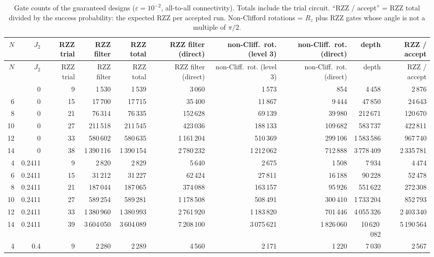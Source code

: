 \documentclass[11pt]{article}
\begin{document}
{\small
\begin{longtable}{rrrrrrrrrr}
\caption{Gate counts of the guaranteed designs ($\varepsilon=10^{-2}$, all-to-all connectivity). Totals include the trial circuit. ``RZZ / accept'' = RZZ total divided by the success probability: the expected RZZ per accepted run. Non-Clifford rotations = $R_z$ plus RZZ gates whose angle is not a multiple of $\pi/2$.}\label{tab:gc}\\
\toprule
$N$ & $J_2$ & RZZ trial & RZZ filter & RZZ total & RZZ filter (direct) & non-Cliff.\ rot. (level 3) & non-Cliff.\ rot. (direct) & depth & RZZ / accept \\
\midrule
\endfirsthead
\toprule
$N$ & $J_2$ & RZZ trial & RZZ filter & RZZ total & RZZ filter (direct) & non-Cliff.\ rot. (level 3) & non-Cliff.\ rot. (direct) & depth & RZZ / accept \\
\midrule
\endhead
\bottomrule
\endfoot
4 & 0 & 9 & 1\,530 & 1\,539 & 3\,060 & 1\,573 & 854 & 4\,458 & 2\,876 \\
6 & 0 & 15 & 17\,700 & 17\,715 & 35\,400 & 11\,867 & 9\,444 & 47\,850 & 24\,643 \\
8 & 0 & 21 & 76\,314 & 76\,335 & 152\,628 & 69\,139 & 39\,980 & 212\,671 & 120\,670 \\
10 & 0 & 27 & 211\,518 & 211\,545 & 423\,036 & 188\,133 & 109\,682 & 583\,737 & 422\,811 \\
12 & 0 & 33 & 580\,602 & 580\,635 & 1\,161\,204 & 510\,369 & 299\,106 & 1\,583\,586 & 967\,740 \\
14 & 0 & 38 & 1\,390\,116 & 1\,390\,154 & 2\,780\,232 & 1\,212\,062 & 712\,888 & 3\,778\,409 & 2\,335\,781 \\
4 & 0.2411 & 9 & 2\,820 & 2\,829 & 5\,640 & 2\,675 & 1\,508 & 7\,934 & 4\,474 \\
6 & 0.2411 & 15 & 31\,212 & 31\,227 & 62\,424 & 27\,811 & 16\,188 & 90\,228 & 52\,478 \\
8 & 0.2411 & 21 & 187\,044 & 187\,065 & 374\,088 & 163\,157 & 95\,926 & 551\,622 & 272\,308 \\
10 & 0.2411 & 27 & 589\,254 & 589\,281 & 1\,178\,508 & 508\,491 & 300\,410 & 1\,733\,204 & 852\,793 \\
12 & 0.2411 & 33 & 1\,380\,960 & 1\,380\,993 & 2\,761\,920 & 1\,183\,820 & 701\,446 & 4\,055\,326 & 2\,403\,340 \\
14 & 0.2411 & 39 & 3\,604\,050 & 3\,604\,089 & 7\,208\,100 & 3\,075\,621 & 1\,826\,060 & 10\,620\,082 & 5\,190\,564 \\
4 & 0.4 & 9 & 2\,280 & 2\,289 & 4\,560 & 2\,171 & 1\,220 & 7\,030 & 2\,567 \\

\end{longtable}}
\end{document}
